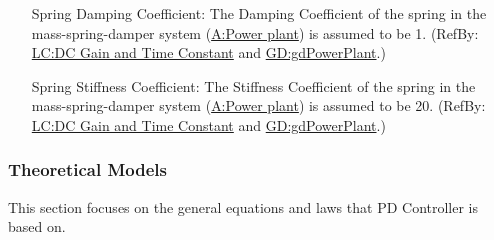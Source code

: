 \documentclass[12pt]{article}
\begin{document}
\begin{itemize}
\item[Spring Damping Coefficient:\phantomsection\label{dampingCoeffSpring}]{The Damping Coefficient of the spring in the mass-spring-damper system (\hyperref[pwrPlant]{A:Power plant}) is assumed to be 1. (RefBy: \hyperref[likeChgPP]{LC:DC Gain and Time Constant} and \hyperref[GD:gdPowerPlant]{GD:gdPowerPlant}.)}
\item[Spring Stiffness Coefficient:\phantomsection\label{stiffnessCoeffSpring}]{The Stiffness Coefficient of the spring in the mass-spring-damper system (\hyperref[pwrPlant]{A:Power plant}) is assumed to be 20. (RefBy: \hyperref[likeChgPP]{LC:DC Gain and Time Constant} and \hyperref[GD:gdPowerPlant]{GD:gdPowerPlant}.)}
\end{itemize}
\subsubsection{Theoretical Models}
\label{Sec:TMs}
This section focuses on the general equations and laws that PD Controller is based on.
\end{document}
